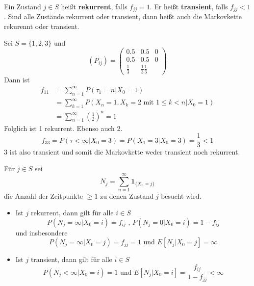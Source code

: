 \documentclass[a4paper,12pt]{article}
\begin{document}
Ein Zustand $j \in S$ heißt \textbf{rekurrent}, falls $f_{jj} = 1$. 
Er heißt \textbf{transient}, falls $f_{jj}<1$.
Sind alle Zustände rekurrent oder transient, dann heißt auch die Markovkette rekurennt oder transient. 


\begin{tcolorbox}[breakable, colframe=blue, colback=white, title=Beispiel 15]
Sei $S = \{1,2,3\}$ und 
$$
(P_{ij}) = \begin{pmatrix}
0.5 & 0.5 & 0 \\
0.5 & 0.5 & 0 \\
\frac{1}{3} & \frac{1}{3} \frac{1}{3}
\end{pmatrix}
$$
Dann ist
\begin{align*}
f_{11} &= \sum_{n=1}^{\infty}P(\tau_1 = n | X_0 = 1)\\
& = \sum_{k=1}^{\infty}P(X_n = 1, X_k = 2 \text{ mit } 1 \leq k < n |X_0 = 1 )\\
& = \sum_{n=1}^{\infty}\left(\frac{1}{2}\right)^n = 1
\end{align*}
Folglich ist 1 rekurrent. Ebenso auch 2.
$$
f_{33} = P(\tau < \infty |X_0 = 3) = P(X_1 = 3| X_0 = 3) =\frac{1}{3} < 1
$$
3 ist also transient und somit die Markovkette weder transient noch rekurrent.

\end{tcolorbox}


\begin{tcolorbox}[breakable, colframe=green, colback=white, title=Satz 18]
Für $j \in S$ sei 
$$
N_j = \sum_{n=1}^{\infty}\textbf{1}_{\{X_n = j\}}
$$
die Anzahl der Zeitpunkte $\geq 1$ zu denen Zustand $j$ besucht wird.\\
\begin{itemize}
\item Ist $j$ rekurrent, dann gilt für alle $i \in S$
$$
P(N_j = \infty | X_0 = i) = f_{ij} \text{ , } P(N_j = 0 |X_0 = i) = 1 - f_{ij}
$$
und insbesondere
$$
P(N_j = \infty | X_0 = j) = f_{jj} = 1 \text{ und } E[N_j|X_0 = j] = \infty
$$
\item Ist $j$ transient, dann gilt für alle $i \in S$
$$
P(N_j <  \infty| X_0 = i) = 1 \text{ und } E[N_j|X_0 = i] = \frac{f_{ij}}{1 - f_{jj}} < \infty
$$
\end{itemize}
\end{tcolorbox}
\end{document}

